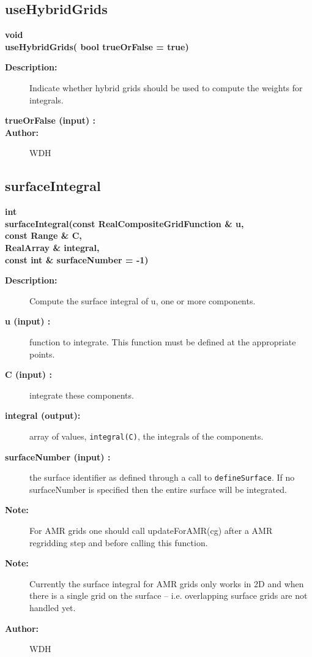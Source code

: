 \subsection{useHybridGrids}
 
\begin{flushleft} \textbf{%
void  \\ 
\settowidth{\IntegrateIncludeArgIndent}{useHybridGrids(}%
useHybridGrids( bool trueOrFalse  = true)
}\end{flushleft}
\begin{description}
\item[{\bf Description:}] 
   Indicate whether hybrid grids should be used to compute the weights for integrals.
\item[{\bf trueOrFalse (input) :}]  
\item[{\bf Author:}]  WDH
\end{description}
\subsection{surfaceIntegral}
 
\begin{flushleft} \textbf{%
int  \\ 
\settowidth{\IntegrateIncludeArgIndent}{surfaceIntegral(}%
surfaceIntegral(const RealCompositeGridFunction \& u, \\ 
\hspace{\IntegrateIncludeArgIndent}const Range \& C, \\ 
\hspace{\IntegrateIncludeArgIndent}RealArray \& integral,\\ 
\hspace{\IntegrateIncludeArgIndent}const int \& surfaceNumber  = -1)
}\end{flushleft}
\begin{description}
\item[{\bf Description:}] 
    Compute the surface integral of u, one or more components.
\item[{\bf u (input) :}]  function to integrate. This function must be defined at the appropriate points.
\item[{\bf C (input) :}]  integrate these components.
\item[{\bf integral (output):}]  array of values, {\tt integral(C)}, the integrals of the components.
\item[{\bf surfaceNumber (input) :}]  the surface identifier as defined through a call to {\tt defineSurface}.
    If no   surfaceNumber is specified then the entire surface will be integrated.

\item[{\bf Note:}]  For AMR grids one should call updateForAMR(cg) after a AMR regridding step and before
     calling this function.
\item[{\bf Note:}]  Currently the surface integral for AMR grids only works in 2D and when there is a
    single grid on the surface -- i.e. overlapping surface grids are not handled yet.
\item[{\bf Author:}]  WDH
\end{description}
